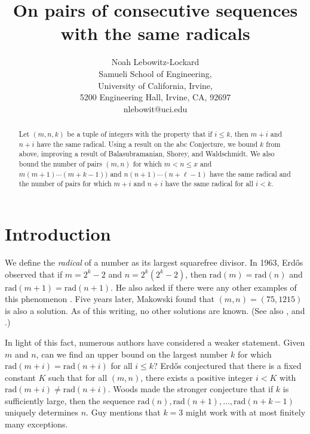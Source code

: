 \documentclass{article}
\theoremstyle{plain}
\theoremstyle{definition}
\begin{document}
\title{On pairs of consecutive sequences with the same radicals}
\author{Noah Lebowitz-Lockard \\
Samueli School of Engineering, \\
University of California, Irvine, \\
5200 Engineering Hall, Irvine, CA, 92697 \\
nlebowit@uci.edu}
\maketitle

\begin{abstract} Let $(m, n, k)$ be a tuple of integers with the property that if $i \leq k$, then $m + i$ and $n + i$ have the same radical. Using a result on the abc Conjecture, we bound $k$ from above, improving a result of Balasubramanian, Shorey, and Waldschmidt. We also bound the number of pairs $(m, n)$ for which $m < n \leq x$ and $m(m + 1) \cdots (m + k - 1))$ and $n(n + 1) \cdots (n + \ell - 1)$ have the same radical and the number of pairs for which $m + i$ and $n + i$ have the same radical for all $i < k$.
\end{abstract}

\section{Introduction}

We define the \emph{radical} of a number as its largest squarefree divisor. In 1963, Erd{\H o}s observed that if $m = 2^k - 2$ and $n = 2^k (2^k - 2)$, then $\textrm{rad} (m) = \textrm{rad} (n)$ and $\textrm{rad} (m + 1) = \textrm{rad} (n + 1)$. He also asked if there were any other examples of this phenomenon \cite[Probl{\` e}me 60]{E1}. Five years later, Makowski \cite{M} found that $(m, n) = (75, 1215)$ is also a solution. As of this writing, no other solutions are known. (See also \cite{E3}, \cite{W} and \cite[\S B19]{G}.)

In light of this fact, numerous authors have considered a weaker statement. Given $m$ and $n$, can we find an upper bound on the largest number $k$ for which $\textrm{rad} (m + i) = \textrm{rad} (n + i)$ for all $i \leq k$? Erd{\H o}s conjectured that there is a fixed constant $K$ such that for all $(m, n)$, there exists a positive integer $i < K$ with $\textrm{rad} (m + i) \neq \textrm{rad} (n + i)$. Woods \cite{Wo} made the stronger conjecture that if $k$ is sufficiently large, then the sequence $\textrm{rad} (n), \textrm{rad} (n + 1), \ldots, \textrm{rad} (n + k - 1)$ uniquely determines $n$. Guy \cite[\S 29]{G} mentions that $k = 3$ might work with at most finitely many exceptions.
\end{document}
